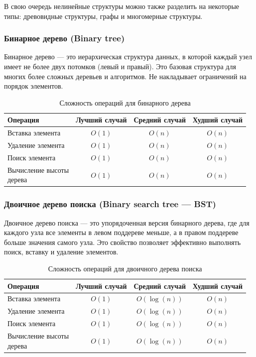 \documentclass[a4paper,12pt]{article}
\begin{document}
В свою очередь нелинейные структуры можно также разделить на некоторые типы: древовидные структуры, графы и многомерные структуры.

\subsubsection{Бинарное дерево (Binary tree)}
\label{subsubsec:бинарное-дерево-binary-tree}

Бинарное дерево --- это иерархическая структура данных, в которой каждый узел имеет не более двух потомков (левый и правый). Это базовая структура для многих более сложных деревьев и алгоритмов. Не накладывает ограничений на порядок элементов.

\begin{table}[H]
    \centering
    \begin{tabular}{|l|c|c|c|}
        \hline
        Операция & Лучший случай & Средний случай & Худший случай \\
        \hline
        Вставка элемента & $O(1)$ & $O(n)$ & $O(n)$ \\
        \hline
        Удаление элемента & $O(1)$ & $O(n)$ & $O(n)$ \\
        \hline
        Поиск элемента & $O(1)$ & $O(n)$ & $O(n)$ \\
        \hline
        \makecell[l]{Вычисление высоты \\дерева} & $O(1)$ & $O(n)$ & $O(n)$ \\
        \hline
    \end{tabular}
    \caption{Сложность операций для бинарного дерева}
\end{table}

\subsubsection{Двоичное дерево поиска (Binary search tree --- BST)}
\label{subsubsec:двоичное-дерево-поиска-binary-search-tree-bst}

Двоичное дерево поиска --- это упорядоченная версия бинарного дерева, где для каждого узла все элементы в левом поддереве меньше, а в правом поддереве больше значения самого узла. Это свойство позволяет эффективно выполнять поиск, вставку и удаление элементов.

\begin{table}[H]
    \centering
    \begin{tabular}{|l|c|c|c|}
        \hline
        Операция & Лучший случай & Средний случай & Худший случай \\
        \hline
        Вставка элемента & $O(1)$ & $O(\log(n))$ & $O(n)$ \\
        \hline
        Удаление элемента & $O(1)$ & $O(\log(n))$ & $O(n)$ \\
        \hline
        Поиск элемента & $O(1)$ & $O(\log(n))$ & $O(n)$ \\
        \hline
        \makecell[l]{Вычисление высоты \\дерева} & $O(1)$ & $O(\log(n))$ & $O(n)$ \\
        \hline
    \end{tabular}
    \caption{Сложность операций для двоичного дерева поиска}
\end{table}
\end{document}
